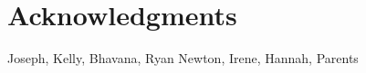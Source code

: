 \chapter*{Acknowledgments}
\label{chap:acknowledgments}
Joseph, Kelly, Bhavana, Ryan Newton, Irene, Hannah, Parents

        

